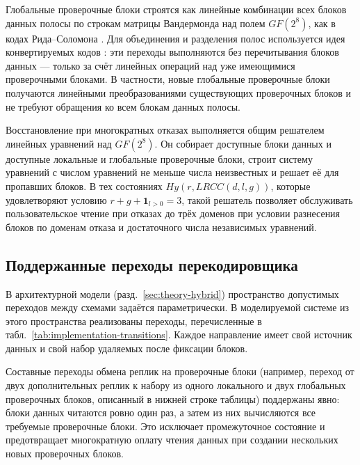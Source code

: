 Глобальные проверочные блоки строятся как линейные комбинации всех блоков
данных полосы по строкам матрицы Вандермонда над полем $GF(2^8)$, как в кодах
Рида--Соломона \cite{reed1960polynomial}. Для объединения и разделения полос
используется идея конвертируемых кодов
\cite{maturana2022convertible,kong2024lrcconvertible}: эти переходы выполняются
без перечитывания блоков данных --- только за счёт линейных операций над уже
имеющимися проверочными блоками. В частности, новые глобальные проверочные
блоки получаются линейными преобразованиями существующих проверочных блоков и
не требуют обращения ко всем блокам данных полосы.

Восстановление при многократных отказах выполняется общим решателем линейных
уравнений над $GF(2^8)$. Он собирает доступные блоки данных и доступные
локальные и глобальные проверочные блоки, строит систему уравнений с числом
уравнений не меньше числа неизвестных и решает её для пропавших блоков. В тех
состояниях \(Hy(r,LRCC(d,l,g))\), которые удовлетворяют условию
\(r + g + \mathbf{1}_{l>0}=3\), такой решатель позволяет обслуживать
пользовательское чтение при отказах до трёх доменов при условии разнесения
блоков по доменам отказа и достаточного числа независимых уравнений.

\subsection{Поддержанные переходы перекодировщика}

В архитектурной модели (разд.~\ref{sec:theory-hybrid}) пространство допустимых
переходов между схемами задаётся параметрически. В моделируемой системе из
этого пространства реализованы переходы, перечисленные в
табл.~\ref{tab:implementation-transitions}. Каждое направление имеет свой
источник данных и свой набор удаляемых после фиксации блоков.

Составные переходы обмена реплик на проверочные блоки (например, переход от
двух дополнительных реплик к набору из одного локального и двух глобальных
проверочных блоков, описанный в нижней строке таблицы) поддержаны явно: блоки
данных читаются ровно один раз, а затем из них вычисляются все требуемые
проверочные блоки. Это исключает промежуточное состояние и предотвращает
многократную оплату чтения данных при создании нескольких новых проверочных
блоков.

